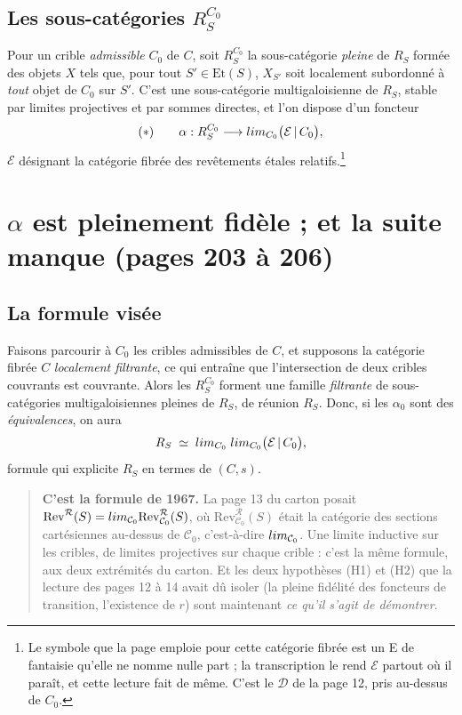 \documentclass[11pt,a4paper]{article}
\begin{document}
\subsection*{Les sous-catégories $R_{S}^{C_{0}}$}

Pour un crible \emph{admissible} $C_{0}$ de $C$, soit $R_{S}^{C_{0}}$ la
sous-catégorie \emph{pleine} de $R_{S}$ formée des objets $X$ tels que, pour
tout $S' \in \mathrm{Et}(S)$, $X_{S'}$ soit localement subordonné à \emph{tout}
objet de $C_{0}$ sur $S'$. C'est une sous-catégorie multigaloisienne de
$R_{S}$, stable par limites projectives et par sommes directes, et l'on
dispose d'un foncteur
\[
  (\ast) \qquad
  \alpha : R_{S}^{C_{0}} \longrightarrow
  \varprojlim_{C_{0}} \bigl(\mathcal{E}\,|\,C_{0}\bigr) ,
\]
$\mathcal{E}$ désignant la catégorie fibrée des revêtements étales
relatifs.\footnote{Le symbole que la page emploie pour cette catégorie fibrée
est un E de fantaisie qu'elle ne nomme nulle part ; la transcription le rend
$\mathcal{E}$ partout où il paraît, et cette lecture fait de même. C'est le
$\mathcal{D}$ de la page 12, pris au-dessus de $C_{0}$.}

\section*{$\alpha$ est pleinement fidèle ; et la suite manque (pages 203 à 206)}

\subsection*{La formule visée}

Faisons parcourir à $C_{0}$ les cribles admissibles de $C$, et supposons la
catégorie fibrée $C$ \emph{localement filtrante}, ce qui entraîne que
l'intersection de deux cribles couvrants est couvrante. Alors les
$R_{S}^{C_{0}}$ forment une famille \emph{filtrante} de sous-catégories
multigaloisiennes pleines de $R_{S}$, de réunion $R_{S}$. Donc, si les
$\alpha_{0}$ sont des \emph{équivalences}, on aura
\[
  R_{S} \;\simeq\; \varinjlim_{C_{0}} \; \varprojlim_{C_{0}}
  \bigl(\mathcal{E}\,|\,C_{0}\bigr) ,
\]
formule qui explicite $R_{S}$ en termes de $(C, s)$.

\begin{quote}
\textbf{C'est la formule de 1967.} La page 13 du carton posait
$\mathrm{Rev}^{\mathcal{R}}(S) = \varinjlim_{\mathcal{C}_{0}}
\mathrm{Rev}^{\mathcal{R}}_{\mathcal{C}_{0}}(S)$, où
$\mathrm{Rev}^{\mathcal{R}}_{\mathcal{C}_{0}}(S)$ était la catégorie des
sections cartésiennes au-dessus de $\mathcal{C}_{0}$, c'est-à-dire
$\varprojlim_{\mathcal{C}_{0}}$. Une limite inductive sur les cribles, de
limites projectives sur chaque crible : c'est la même formule, aux deux
extrémités du carton. Et les deux hypothèses (H1) et (H2) que la lecture des
pages 12 à 14 avait dû isoler (la pleine fidélité des foncteurs de transition,
l'existence de $r$) sont maintenant \emph{ce qu'il s'agit de démontrer}.
\end{quote}
\end{document}

